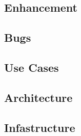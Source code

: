 \subsection{Enhancement}
\label{sec:enhancement}


\subsection{Bugs}
\label{sec:bugs}


\subsection{Use Cases}
\label{sec:use-cases}


\subsection{Architecture}
\label{sec:architecture}


\subsection{Infastructure}
\label{sec:infastructure}



